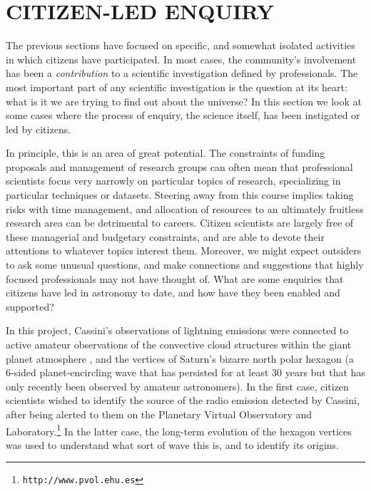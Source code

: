\documentclass{ar2e}
\def\CaseStudy#1{\noindent{\it\bf #1 \,\,\,\,}}
\def\url#1{\texttt{#1}}
\begin{document}

\section{CITIZEN-LED ENQUIRY}
\label{sec:explore}

The previous sections have focused on specific, and somewhat  isolated
activities in which citizens have participated. In most cases, the community's
involvement has been a {\it contribution} to a scientific investigation defined
by professionals. The most important part of any scientific investigation is the
question at its heart: what is it we are trying to find out about the universe?
In this section we look at some cases where the process of enquiry, the science
itself, has been instigated or led by citizens.  

In principle, this is an area of great potential. The constraints of funding
proposals and management of research groups can often mean that professional
scientists focus very narrowly on particular topics of research, specializing in
particular techniques or datasets.  Steering away from this course implies
taking risks with time management, and allocation of resources to an ultimately
fruitless research area can be detrimental to careers.  Citizen scientists are
largely free of these managerial and budgetary constraints, and are able to
devote their attentions to whatever topics interest them. Moreover, we might
expect outsiders to ask some unusual questions, and make connections and
suggestions that highly focused professionals may not have thought of. What are
some enquiries that citizens have led in astronomy to date, and how have they
been enabled and supported?



\CaseStudy{Saturn Storm Watch.}  
In this project, Cassini's observations of lightning emissions were connected to
active amateur observations of the convective cloud structures within the giant
planet atmosphere \citep{11fischer},  and the vertices of Saturn's bizarre
north polar hexagon \citep{godfrey88} (a 6-sided planet-encircling wave that has
persisted for at least 30 years but that has only recently been observed by
amateur astronomers).  In the first case, citizen scientists wished to identify
the source of the radio emission detected by Cassini, after being alerted to
them on the Planetary Virtual  Observatory and Laboratory.\footnote{\url{http://www.pvol.ehu.es}} 
In the latter case, the long-term
evolution of the hexagon vertices was used to understand what sort of wave this
is, and to identify its origins.
\end{document}
